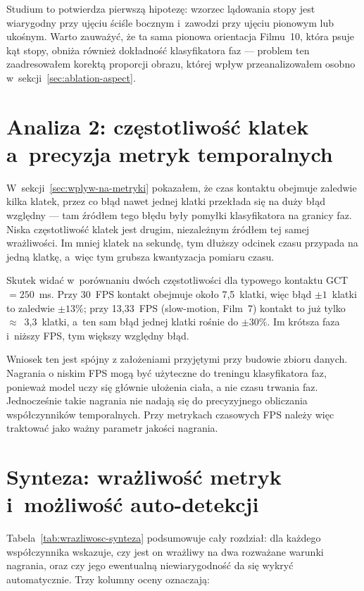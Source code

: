 Studium to potwierdza pierwszą hipotezę: wzorzec lądowania stopy jest wiarygodny przy ujęciu ściśle bocznym i~zawodzi przy ujęciu pionowym lub ukośnym. Warto zauważyć, że ta sama pionowa orientacja Filmu~10, która psuje kąt stopy, obniża również dokładność klasyfikatora faz --- problem ten zaadresowałem korektą proporcji obrazu, której wpływ przeanalizowałem osobno w~sekcji~\ref{sec:ablation-aspect}.

\section{Analiza 2: częstotliwość klatek a~precyzja metryk temporalnych}
\label{sec:case2-fps}

W~sekcji~\ref{sec:wplyw-na-metryki} pokazałem, że czas kontaktu obejmuje zaledwie kilka klatek, przez co błąd nawet jednej klatki przekłada się na duży błąd względny --- tam źródłem tego błędu były pomyłki klasyfikatora na granicy faz. Niska częstotliwość klatek jest drugim, niezależnym źródłem tej samej wrażliwości. Im mniej klatek na sekundę, tym dłuższy odcinek czasu przypada na jedną klatkę, a~więc tym grubsza kwantyzacja pomiaru czasu.

Skutek widać w~porównaniu dwóch częstotliwości dla typowego kontaktu GCT~$=250$~ms. Przy 30~FPS kontakt obejmuje około 7,5~klatki, więc błąd $\pm 1$~klatki to zaledwie $\pm 13\%$; przy 13,33~FPS (slow-motion, Film~7) kontakt to już tylko $\approx$~3,3~klatki, a~ten sam błąd jednej klatki rośnie do $\pm 30\%$. Im krótsza faza i~niższy FPS, tym większy względny błąd.

Wniosek ten jest spójny z założeniami przyjętymi przy budowie zbioru danych. Nagrania o niskim FPS mogą być użyteczne do treningu klasyfikatora faz, ponieważ model uczy się głównie ułożenia ciała, a nie czasu trwania faz. Jednocześnie takie nagrania nie nadają się do precyzyjnego obliczania współczynników temporalnych. Przy metrykach czasowych FPS należy więc traktować jako ważny parametr jakości nagrania.


\section{Synteza: wrażliwość metryk i~możliwość auto-detekcji}
\label{sec:synteza-wrazliwosc}

Tabela~\ref{tab:wrazliwosc-synteza} podsumowuje cały rozdział: dla każdego współczynnika wskazuje, czy jest on wrażliwy na dwa rozważane warunki nagrania, oraz czy jego ewentualną niewiarygodność da się wykryć automatycznie. Trzy kolumny oceny oznaczają:

